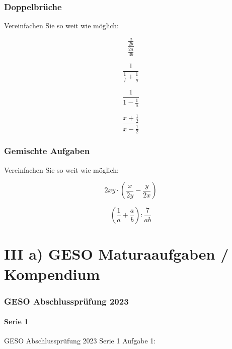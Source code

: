 \section{Doppelbrüche}
Vereinfachen Sie so weit wie möglich:

\begin{bbwAufgabenBlock}
\item $$\frac{\frac{a}{2b}}{\frac{2a}{3b}}$$

\item $$\frac{1}{\frac1f + \frac1g}$$

\item $$\frac{1}{1-\frac1a}$$

\item $$\frac{x+\frac12}{x-\frac12}$$

\end{bbwAufgabenBlock}
\newpage
\section{Gemischte Aufgaben}
Vereinfachen Sie so weit wie möglich:

\begin{bbwAufgabenBlock}
\item $$2xy \cdot{} \left( \frac{x}{2y} - \frac{y}{2x} \right)$$

\item $$\left( \frac1a + \frac{a}b \right) : \frac7{ab}$$
\end{bbwAufgabenBlock}
\newpage


\part*{III a) GESO Maturaaufgaben / Kompendium}


\section*{GESO Abschlussprüfung 2023}
\subsection*{Serie 1}
GESO Abschlussprüfung 2023 Serie 1 Aufgabe 1:

